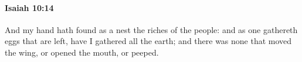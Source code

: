 
		\paragraph{Isaiah 10:14} %
			\label{ISAIAH-10-14}

			And my hand hath found as a nest the riches of the people: and as one gathereth eggs that are left, have I gathered all the earth; and there was none that moved the wing, or opened the mouth, or peeped.


